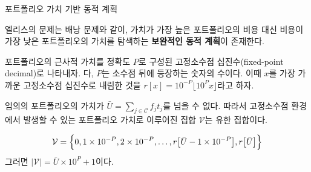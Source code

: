 \documentclass[10pt,slidestop,compress,mathserif,notheorems]{beamer}
\newif\ifen
\theoremstyle{definition}
\theoremstyle{definition}
\begin{document}
\begin{frame}{\ifen Valuation-based dynamic program \else 포트폴리오 가치 기반 동적 계획 \fi}
\ifen 
As with the knapsack problem, Ellis's problem admits a \textbf{complementary dynamic program} that iterates on the value of the cheapest portfolio instead of on the cost of the most valuable portfolio.

We represent approximate portfolio valuations using a \textbf{fixed-point decimal} with a precision of $P$, where $P$ is the number of digits to retain after the decimal point. Let $r[x] =  10^{-P}\lfloor 10^P x \rfloor$ denote the value of $x$ rounded down to its nearest fixed-point representation.

$\bar U = \sum_{j\in \mathcal{C}} f_j t_j$ is an upper bound on the valuation of any portfolio, so the set $\mathcal{V}$ of possible valuations possible in the fixed-point framework is finite:
\else
엘리스의 문제는 배낭 문제와 같이, 가치가 가장 높은 포트폴리오의 비용 대신 비용이 가장 낮은 포트폴리오의 가치를 탐색하는 \textbf{보완적인 동적 계획}이 존재한다. 

포트폴리오의 근사적 가치를 정확도 $P$로 구성된 고정소수점 십진수(fixed-point decimal)로 나타내자. 다, $P$는 소수점 뒤에 등장하는 숫자의 수이다. 이때 $x$를 가장 가까운 고정소수점 십진수로 내림한 것을 $r[x] =  10^{-P}\lfloor 10^P x \rfloor$라고 하자.

임의의 포트폴리오의 가치가 $\bar U = \sum_{j\in \mathcal{C}} f_j t_j$를 넘을 수 없다. 따라서 고정소수점 환경에서 발생할 수 있는 포트폴리오 가치로 이루어진 집합 $\mathcal{V}$는 유한 집합이다.
\fi
\begin{equation*}
\mathcal{V} = \Bigl\{0, 1\times 10^{-P}, 2\times 10^{-P}, \dots, r\bigl[\bar U- 1\times 10^{-P}\bigr], r\bigl[\bar U\bigr]\Bigr\}
\end{equation*}
\ifen Then $|\mathcal{V} | = \bar U \times 10^P + 1$.
\else 그러면 $|\mathcal{V} | = \bar U \times 10^P + 1$이다.\fi

\end{frame}
\end{document}
